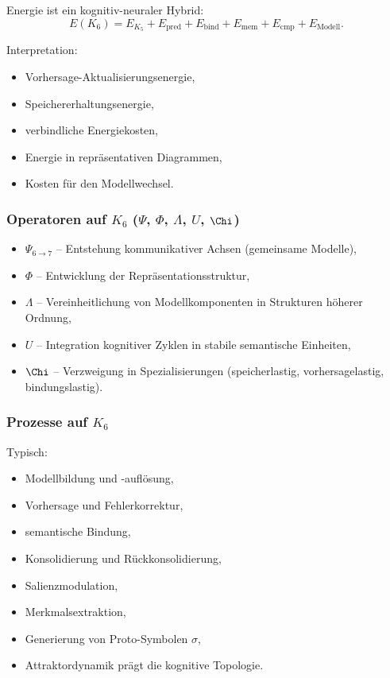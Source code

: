 Energie ist ein kognitiv-neuraler Hybrid:
\[
E(K_6)
= E_{K_5}
+ E_{\mathrm{pred}}
+ E_{\mathrm{bind}}
+ E_{\mathrm{mem}}
+ E_{\mathrm{cmp}}
+ E_{\mathrm{Modell}}.
\]

Interpretation:
\begin{itemize}
    \item Vorhersage-Aktualisierungsenergie,
    \item Speichererhaltungsenergie,
    \item verbindliche Energiekosten,
    \item Energie in repräsentativen Diagrammen,
    \item Kosten für den Modellwechsel.
\end{itemize}

\subsubsection{Operatoren auf \texorpdfstring{$K_6$}{K_6} (\texorpdfstring{$\Psi$}{\Psi}, \texorpdfstring{$\Phi$}{\Phi}, \texorpdfstring{$\Lambda$}{\Lambda}, \texorpdfstring{$U$}{U}, \texorpdfstring{$\Chi$}{\Chi})}

\begin{itemize}
    \item $\Psi_{6\to7}$ – Entstehung kommunikativer Achsen (gemeinsame Modelle),
    \item $\Phi$ – Entwicklung der Repräsentationsstruktur,
    \item $\Lambda$ – Vereinheitlichung von Modellkomponenten in Strukturen höherer Ordnung,
    \item $U$ – Integration kognitiver Zyklen in stabile semantische Einheiten,
    \item $\Chi$ – Verzweigung in Spezialisierungen (speicherlastig, vorhersagelastig, bindungslastig).
\end{itemize}

\subsubsection{Prozesse auf \texorpdfstring{$K_6$}{K_6}}

Typisch:
\begin{itemize}
    \item Modellbildung und -auflösung,
    \item Vorhersage und Fehlerkorrektur,
    \item semantische Bindung,
    \item Konsolidierung und Rückkonsolidierung,
    \item Salienzmodulation,
    \item Merkmalsextraktion,
    \item Generierung von Proto-Symbolen $\sigma$,
    \item Attraktordynamik prägt die kognitive Topologie.
\end{itemize}

